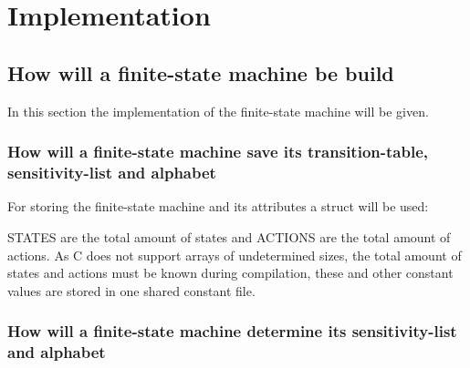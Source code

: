 \hypertarget{implementation}{%
\section{Implementation}\label{implementation}}

\hypertarget{how-will-a-finite-state-machine-be-build}{%
\subsection{How will a finite-state machine be
build}\label{how-will-a-finite-state-machine-be-build}}

In this section the implementation of the finite-state machine will be
given.

\hypertarget{how-will-a-finite-state-machine-save-its-transition-table-sensitivity-list-and-alphabet}{%
\subsubsection{How will a finite-state machine save its
transition-table, sensitivity-list and
alphabet}\label{how-will-a-finite-state-machine-save-its-transition-table-sensitivity-list-and-alphabet}}

For storing the finite-state machine and its attributes a struct will be
used:

\begin{Shaded}
\begin{Highlighting}[]
 
\NormalTok{\{}

\end{Highlighting}
\end{Shaded}

STATES are the total amount of states and ACTIONS are the total amount
of actions. As C does not support arrays of undetermined sizes, the
total amount of states and actions must be known during compilation,
these and other constant values are stored in one shared constant file.

\hypertarget{how-will-a-finite-state-machine-determine-its-sensitivity-list-and-alphabet}{%
\subsubsection{How will a finite-state machine determine its
sensitivity-list and
alphabet}\label{how-will-a-finite-state-machine-determine-its-sensitivity-list-and-alphabet}}

